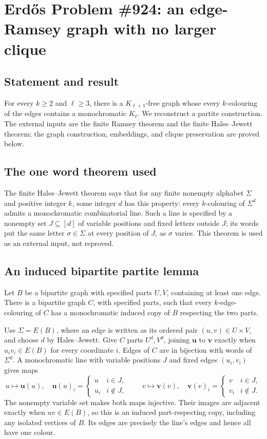 \section*{Erd\H{o}s Problem \#924: an edge-Ramsey graph with no larger clique}
\subsection*{Statement and result}
For every \(k\geq2\) and \(\ell\geq3\), there is a \(K_{\ell+1}\)-free graph whose every \(k\)-colouring of the edges contains a monochromatic \(K_\ell\).
We reconstruct a partite construction. The external inputs are the finite Ramsey theorem and the finite Hales--Jewett theorem; the graph construction, embeddings, and clique preservation are proved below.

\subsection*{The one word theorem used}
The finite Hales--Jewett theorem says that for any finite nonempty alphabet \(\Sigma\) and positive integer \(k\), some integer \(d\) has this property: every \(k\)-colouring of \(\Sigma^d\) admits a monochromatic combinatorial line. Such a line is specified by a nonempty set \(J\subseteq[d]\) of variable positions and fixed letters outside \(J\); its words put the same letter \(\sigma\in\Sigma\) at every position of \(J\), as \(\sigma\) varies.
This theorem is used as an external input, not reproved.

\subsection*{An induced bipartite partite lemma}
Let \(B\) be a bipartite graph with specified parts \(U,V\), containing at least one edge. There is a bipartite graph \(C\), with specified parts, such that every \(k\)-edge-colouring of \(C\) has a monochromatic induced copy of \(B\) respecting the two parts.

Use \(\Sigma=E(B)\), where an edge is written as its ordered pair \((u,v)\in U\times V\), and choose \(d\) by Hales--Jewett. Give \(C\) parts \(U^d,V^d\), joining \(\mathbf u\) to \(\mathbf v\) exactly when \(u_iv_i\in E(B)\) for every coordinate \(i\).
Edges of \(C\) are in bijection with words of \(\Sigma^d\).
A monochromatic line with variable positions \(J\) and fixed edges \((u_i,v_i)\) gives maps
\[
u\longmapsto\mathbf u(u),\quad
\mathbf u(u)_i=\begin{cases}u&i\in J,\\u_i&i\notin J,\end{cases}
\qquad
v\longmapsto\mathbf v(v),\quad
\mathbf v(v)_i=\begin{cases}v&i\in J,\\v_i&i\notin J.\end{cases}
\]
The nonempty variable set makes both maps injective. Their images are adjacent exactly when \(uv\in E(B)\), so this is an induced part-respecting copy, including any isolated vertices of \(B\). Its edges are precisely the line's edges and hence all have one colour.

